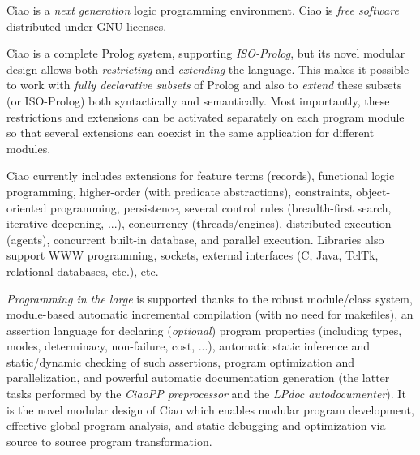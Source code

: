 \documentclass{article}
\newcommand{\ciao}{\psfig{figure=ciao_s.ps}}
\begin{document}
\pagestyle{empty}

\twocolumn[
\hbox{
\ciao~~~~~~~~
\begin{minipage}[b]{0.5\textwidth}
\begin{huge}
{\bf The Ciao System}\\[-0.25\baselineskip]
\end{huge}
\end{minipage}
}
\vspace{0.5\baselineskip}
]

Ciao is a \emph{next generation} logic programming environment. Ciao is
\emph{free software} distributed under GNU licenses.

Ciao is a complete Prolog system, supporting \emph{ISO-Prolog}, but
its novel modular design allows both \emph{restricting} and
\emph{extending} the language. This makes it possible to work with
\emph{fully declarative subsets} of Prolog and also to \emph{extend}
these subsets (or ISO-Prolog) both syntactically and semantically.
Most importantly, these restrictions and extensions can be activated
separately on each program module so that several extensions can 
coexist in the same application for different modules.

Ciao currently includes extensions for feature terms (records),
functional logic programming, higher-order (with predicate
abstractions), constraints, object-oriented programming, persistence,
several control rules (breadth-first search, iterative deepening,
...), concurrency (threads/engines), distributed execution (agents),
concurrent built-in database, and parallel execution.  Libraries also
support WWW programming, sockets, external interfaces (C, Java, TclTk,
relational databases, etc.), etc.

\emph{Programming in the large} is supported thanks to the robust
module/class system, module-based automatic incremental compilation
(with no need for makefiles), an assertion language for declaring
(\emph{optional}) program properties (including types, modes,
determinacy, non-failure, cost, ...), automatic static inference and
static/dynamic checking of such assertions, program optimization and
parallelization, and powerful automatic documentation generation (the
latter tasks performed by the \emph{CiaoPP preprocessor} and the
\emph{LPdoc autodocumenter}).  It is the novel modular design of Ciao
which enables modular program development, effective global program
analysis, and static debugging and optimization via source to source
program transformation.
\end{document}
